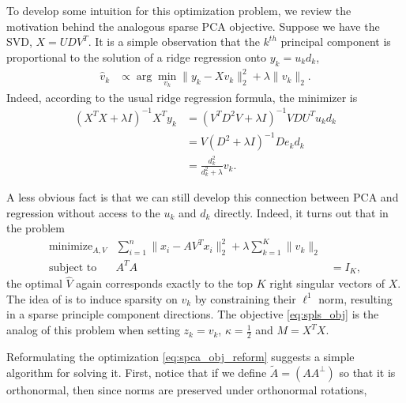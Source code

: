 \documentclass{article}
\begin{document}
To develop some intuition for this optimization problem, we review the
motivation behind the analogous sparse PCA objective. Suppose we have the SVD,
$X = UDV^T$. It is a simple observation that the $k^{th}$ principal component is
proportional to the solution of a ridge regression onto $y_k = u_k d_k$,
\begin{align*}
  \hat{v}_k &\propto \arg \min_{v_k} \|y_k - X v_k\|_2^2 + \lambda \|v_k \|_2.
\end{align*}
Indeed, according to the usual ridge regression formula, the minimizer is
\begin{align*}
  \left(X^TX + \lambda I\right)^{-1} X^T y_k &= \left(V^T D^2 V + \lambda I\right)^{-1} V D U^T u_k d_k \\
  &= V\left(D^2 + \lambda I\right)^{-1} D e_k d_k \\
  &= \frac{d_k^2}{d_k^2 + \lambda}v_k.
\end{align*}

A less obvious fact is that we can still develop this connection between PCA and
regression without access to the $u_k$ and $d_k$ directly. Indeed, it turns out
that in the problem
\begin{align}
  \label{eq:spca_obj_reform}
  \text{minimize}_{A, V} &\sum_{i = 1}^{n} \|x_i - AV^T x_i\|_2^2 +
  \lambda \sum_{k = 1}^{K} \|v_k\|_2 \\
  \text{subject to } & A^T A &= I_K,
\end{align}
the optimal $\hat{V}$ again corresponds exactly to the top $K$ right singular
vectors of $X$. The idea of \cite{zou2006sparse} is to induce sparsity on $v_k$
by constraining their $\ell^1$ norm, resulting in a sparse principle component
directions. The objective \ref{eq:spls_obj} is the analog of this problem when
setting $z_k = v_k$, $\kappa = \frac{1}{2}$ and $M = X^T X$.

Reformulating the optimization \ref{eq:spca_obj_reform} suggests a simple
algorithm for solving it. First, notice that if we define $\tilde{A} = \left(A
A^{\perp}\right)$ so that it is orthonormal, then since norms are preserved
under orthonormal rotations,
\end{document}
